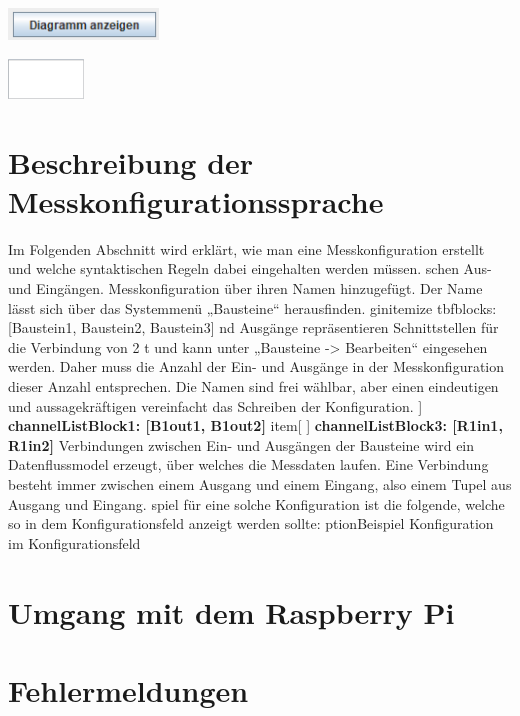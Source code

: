 \documentclass[parskip=full]{scrartcl}
\begin{document}
\begin{flushleft}
    \includegraphics[width = 4cm]{Grafiken/13-Diagramm_anzeigen.png}
\end{flushleft}

\begin{flushleft}
    \includegraphics[width = 2cm]{Grafiken/14-Datenanzeige.png}
\end{flushleft}

\section{Beschreibung der Messkonfigurationssprache}


Im Folgenden Abschnitt wird erklärt, wie man eine Messkonfiguration erstellt und welche syntaktischen Regeln dabei eingehalten werden müssen.  
schen Aus- und Eingängen.  
 Messkonfiguration über ihren Namen hinzugefügt. Der Name lässt sich über das Systemmenü „Bausteine“ herausfinden.   
gin{itemize}
tbf{blocks: [Baustein1, Baustein2, Baustein3]}
nd Ausgänge repräsentieren Schnittstellen für die Verbindung von 2  
t und kann unter „Bausteine -> Bearbeiten“ eingesehen werden. Daher muss die Anzahl der Ein- und Ausgänge in der Messkonfiguration dieser Anzahl entsprechen. Die Namen sind frei wählbar, aber einen eindeutigen und aussagekräftigen vereinfacht das Schreiben der Konfiguration.  
 ] \textbf{channelListBlock1: [B1out1, B1out2]}
item[ ] \textbf{channelListBlock3: [R1in1, R1in2]} 
 Verbindungen zwischen Ein- und Ausgängen der Bausteine wird ein Datenflussmodel erzeugt, über welches die Messdaten laufen.  Eine Verbindung besteht immer zwischen einem Ausgang und einem Eingang, also einem Tupel aus Ausgang und Eingang.   
spiel für eine solche Konfiguration ist die folgende, welche so in dem Konfigurationsfeld anzeigt werden sollte:
ption{Beispiel Konfiguration im Konfigurationsfeld}


\section{Umgang mit dem Raspberry Pi}

\section{Fehlermeldungen}
\end{document}
